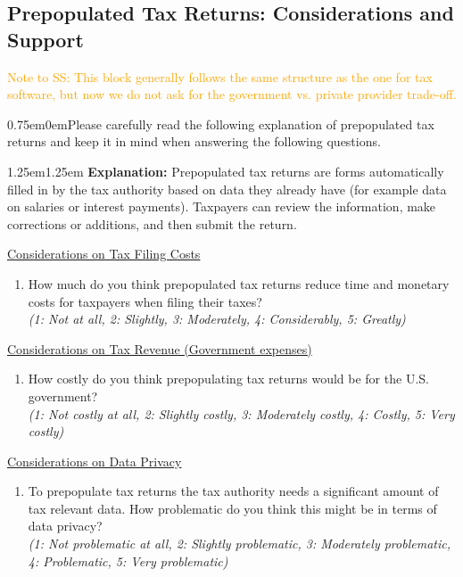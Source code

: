 \documentclass[11pt]{article}
\newcommand{\tk}[1]{\textcolor{orange}{#1}}
\begin{document}
\subsection*{Prepopulated Tax Returns: Considerations and Support} 
\tk{Note to SS: This block generally follows the same structure as the one for tax software, but now we do not ask for the government vs. private provider trade-off. }
\vspace{0.5em}
\begin{adjustwidth}{0.75em}{0em}Please carefully read the following explanation of prepopulated tax returns and keep it in mind when answering the following questions. \end{adjustwidth}
\vspace{0.5em}
\begin{adjustwidth}{1.25em}{1.25em} \textbf{Explanation:} Prepopulated tax returns are forms automatically filled in by the tax authority  based on data they already have (for example data on salaries or interest payments). Taxpayers can review the information, make corrections or additions, and then submit the return.
\end{adjustwidth}
\vspace{0.5em}
\underline{Considerations on Tax Filing Costs}
\begin{enumerate}[resume]
    \item How much do you think prepopulated tax returns reduce time and monetary costs for taxpayers when filing their taxes?\\
    \textit{(1: Not at all, 2: Slightly, 3: Moderately, 4: Considerably, 5: Greatly)}
\end{enumerate}
\underline{Considerations on Tax Revenue (Government expenses)}
\begin{enumerate}[resume]
     \item How costly do you think prepopulating tax returns would be for the U.S. government? \\
    \textit{(1: Not costly at all, 2: Slightly costly, 3: Moderately costly, 4: Costly, 5: Very costly)} 
\end{enumerate}
\underline{Considerations on Data Privacy}
\begin{enumerate}[resume]
     \item To prepopulate tax returns the tax authority needs a significant amount of tax relevant data. How problematic do you think this might be in terms of data privacy? \\ 
     \textit{(1: Not problematic at all, 2: Slightly problematic, 3: Moderately problematic, 4: Problematic, 5: Very problematic)} 
\end{enumerate}
\end{document}
